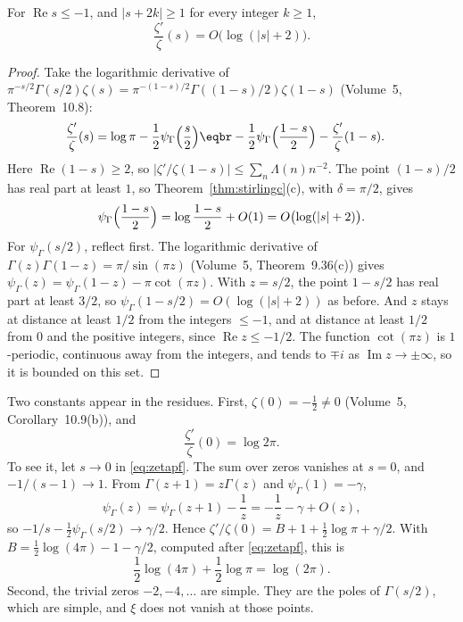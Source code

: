 \begin{lemma}\label{lem:leftzeta}
For $\operatorname{Re}s\le-1$, and $|s+2k|\ge1$ for every integer $k\ge1$,
\[
\frac{\zeta'}\zeta(s)=O\bigl(\log(|s|+2)\bigr).
\]
\end{lemma}
\begin{proof}
Take the logarithmic derivative of $\pi^{-s/2}\Gamma(s/2)\zeta(s)=\pi^{-(1-s)/2}\Gamma((1-s)/2)\zeta(1-s)$ (Volume~5, Theorem~10.8):
\[
\begin{aligned}\frac{\zeta'}\zeta(s)&=\log\pi-\frac12\psi_\Gamma\Bigl(\frac s2\Bigr)\eqbr-\frac12\psi_\Gamma\Bigl(\frac{1-s}2\Bigr)-\frac{\zeta'}\zeta(1-s).\end{aligned}
\]
Here $\operatorname{Re}(1-s)\ge2$, so $|\zeta'/\zeta(1-s)|\le\sum_n\Lambda(n)n^{-2}$. The point $(1-s)/2$ has real part at least $1$, so Theorem~\ref{thm:stirlingc}(c), with $\delta=\pi/2$, gives
\[
\psi_\Gamma\Bigl(\frac{1-s}2\Bigr)=\log\frac{1-s}2+O(1)=O\bigl(\log(|s|+2)\bigr).
\]
For $\psi_\Gamma(s/2)$, reflect first. The logarithmic derivative of $\Gamma(z)\Gamma(1-z)=\pi/\sin(\pi z)$ (Volume~5, Theorem~9.36(c)) gives $\psi_\Gamma(z)=\psi_\Gamma(1-z)-\pi\cot(\pi z)$. With $z=s/2$, the point $1-s/2$ has real part at least $3/2$, so $\psi_\Gamma(1-s/2)=O(\log(|s|+2))$ as before. And $z$ stays at distance at least $1/2$ from the integers $\le-1$, and at distance at least $1/2$ from $0$ and the positive integers, since $\operatorname{Re}z\le-1/2$. The function $\cot(\pi z)$ is $1$-periodic, continuous away from the integers, and tends to $\mp i$ as $\operatorname{Im}z\to\pm\infty$, so it is bounded on this set.
\end{proof}

Two constants appear in the residues. First, $\zeta(0)=-\frac12\ne0$ (Volume~5, Corollary~10.9(b)), and
\begin{equation}\label{eq:zetaprime0}
\frac{\zeta'}\zeta(0)=\log2\pi.
\end{equation}
To see it, let $s\to0$ in \eqref{eq:zetapf}. The sum over zeros vanishes at $s=0$, and $-1/(s-1)\to1$. From $\Gamma(z+1)=z\Gamma(z)$ and $\psi_\Gamma(1)=-\gamma$,
\[
\psi_\Gamma(z)=\psi_\Gamma(z+1)-\frac1z=-\frac1z-\gamma+O(z),
\]
so $-1/s-\frac12\psi_\Gamma(s/2)\to\gamma/2$. Hence $\zeta'/\zeta(0)=B+1+\frac12\log\pi+\gamma/2$. With $B=\frac12\log(4\pi)-1-\gamma/2$, computed after \eqref{eq:zetapf}, this is
\[
\frac12\log(4\pi)+\frac12\log\pi=\log(2\pi).
\]
Second, the trivial zeros $-2,-4,\dots$ are simple. They are the poles of $\Gamma(s/2)$, which are simple, and $\xi$ does not vanish at those points.

